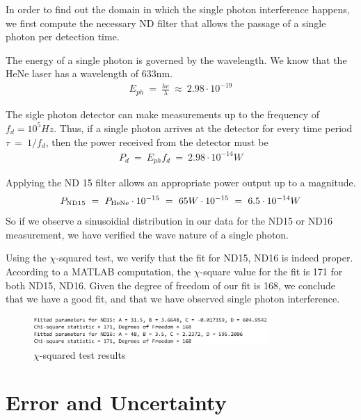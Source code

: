 \documentclass{article}
\numberwithin{equation}{section}
\begin{document}
In order to find out the domain in which the single 
photon interference happens, we first compute 
the necessary ND filter that allows the passage of a 
single photon per detection time. 

The energy of a single photon is governed by the wavelength. 
We know that the HeNe laser has a wavelength of 633nm. 
\begin{align}
    E_{ph} \ = \ \frac{h c} {\lambda} \ \approx \ 2.98 \cdot 10^{-19}
\end{align}


The sigle photon detector can make measurements up to the 
frequency of $f_{d} = 10^5 Hz$. Thus, if a single photon arrives at 
the detector for every time period $\tau \ = \ 1/f_d$, then 
the power received from the detector must be  
\begin{align}
    P_d \ = \ E_{ph} f_d \ = \ 2.98 \cdot 10^{-14} W
\end{align}

Applying the ND 15 filter allows an appropriate power output up to a magnitude. 
\begin{align}
    P_{\rm ND15} \ =\ P_{\rm HeNe} \cdot 10^{-15} \ = \ 65W \cdot 10^{-15} \ = \ 6.5 \cdot 10^{-14} W 
\end{align}
So if we observe a sinusoidial distribution in our data for the ND15 or 
ND16 measurement, we have verified the wave nature of a single photon. 

Using the $\chi$-squared test, we verify that the fit for ND15, ND16 is 
indeed proper. According to a MATLAB computation, the $\chi$-square value for 
the fit is 171 for both ND15, ND16. Given the degree of freedom of our 
fit is 168, we conclude that we have a good fit, and that we have 
observed single photon interference. 

\begin{figure}[htp]
    \centering
    \includegraphics[width=0.8\textwidth]{ChiSq.png} %
    \caption{$\chi$-squared test results}
\end{figure}



\section{Error and Uncertainty}
\end{document}
